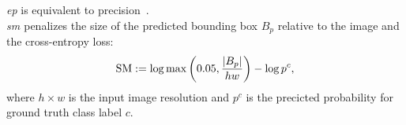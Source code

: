 \noindent \emph{\gls{ep}\autocite{wang2020score}} is equivalent to precision~.\\

\noindent \emph{\gls{sm} \autocite{dabkowski2017real}} penalizes the size of the predicted bounding 
box $B_p$ relative to the image and the cross-entropy loss:
\begin{equation}
	\operatorname{SM} \mathrel{:=} \log \max\left({ 0.05, \frac{\left|{B_p}\right|}{hw} }\right) - \log p^c,
\label{eq:sm}
\end{equation}
where $h \times w$ is the input image resolution and $p^c$ is the precicted probability for ground 
truth class label $c$.